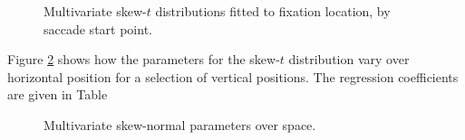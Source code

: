 \documentclass[a4paper, onecolumn, oneside, 11pt]{article}
\begin{document}
\begin{figure}
\caption{Multivariate skew-$t$ distributions fitted to fixation location, by saccade start point.}
\label{fig:exampleSkewNormal}
\end{figure}

Figure \ref{fig:smParamsOverSpace} shows how the parameters for the skew-$t$ distribution vary over horizontal position for a selection of vertical positions. The regression coefficients are given in Table 



\begin{figure}
\centering
\caption{Multivariate skew-normal parameters over space.}
\label{fig:smParamsOverSpace}
\end{figure}
\end{document}
